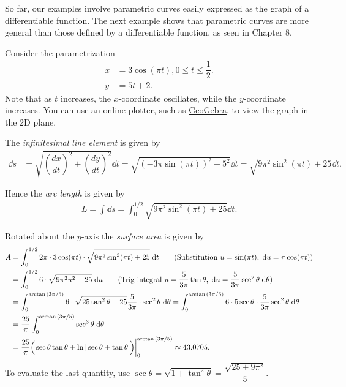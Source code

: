 So far, our examples involve parametric curves easily expressed as the graph of a differentiable function. The next example shows that parametric curves are more general than those defined by a differentiable function, as seen in Chapter 8.
\begin{ex}
    Consider the parametrization \begin{align*}
    x &= 3\cos(\pi t), 0 \leq t \leq \dfrac{1}{2}.\\
    y &= 5t+2.
\end{align*}
Note that as $t$ increases, the $x$-coordinate oscillates, while the $y$-coordinate increases. You can use an online plotter, such as \href{https://www.geogebra.org/m/cAsHbXEU}{GeoGebra}, to view the graph in the 2D plane.

The \textit{infinitesimal line element} is given by
\begin{align*}
    \dd s &= \sqrt{\left(\dfrac{dx}{dt}\right)^2 + \left(\dfrac{dy}{dt}\right)^2} \dd t = \sqrt{\left(-3\pi \sin(\pi t)\right)^2 + 5^2} \dd t = \sqrt{9\pi^2 \sin^2 (\pi t) + 25} \dd t.
\end{align*}

Hence the \textit{arc length} is given by
\begin{align*}
    L = \int \dd s = \int_0^{1/2} \sqrt{9\pi^2 \sin^2 (\pi t) + 25} \dd t.
\end{align*}

Rotated about the $y$-axis the \textit{surface area} is given by
\begin{align*}
    A &= \int_0^{1/2} 2\pi \cdot 3\cos(\pi t) \cdot \sqrt{9\pi^2 \sin^2 (\pi t) + 25} \dd t \tag{Substitution $u = \sin(\pi t), \dd u = \pi \cos(\pi t)$}\\
    &= \int_0^{1/2} 6 \cdot \sqrt{9\pi^2 u^2 + 25} \dd u \tag{Trig integral $u = \dfrac{5}{3\pi} \tan \theta, \dd u = \dfrac{5}{3\pi} \sec^2 \theta \dd \theta$}\\
    &= \int_0^{\arctan{(3\pi/5)}}  6\cdot \sqrt{25\tan^2 \theta + 25} \dfrac{5}{3\pi} \cdot \sec^2 \theta \dd \theta = \int_0^{\arctan{(3\pi/5)}} 6\cdot 5 \sec\theta \cdot \dfrac{5}{3\pi} \sec^2 \theta \dd \theta\\
    &= \frac{25}{\pi} \int_0^{\arctan{(3\pi/5)}} \sec^3 \theta \dd \theta \\
    &= \frac{25}{\pi} \Big(\sec\theta \tan \theta + \ln|\sec \theta + \tan \theta| \Big) \bigg|_0^{\arctan{(3\pi/5)}} \approx 43.0705.
\end{align*}
To evaluate the last quantity, use $\sec \theta = \sqrt{1+\tan^2 \theta} = \dfrac{\sqrt{25+9\pi^2}}{5}$.
\end{ex}



